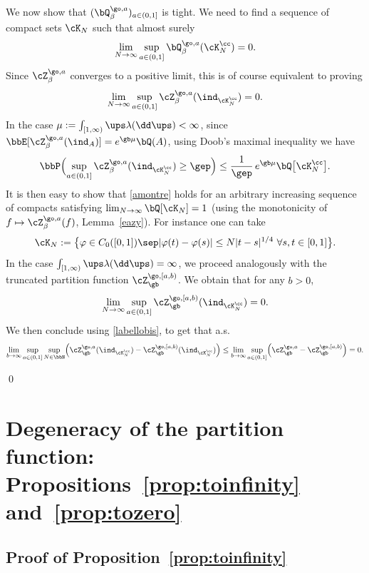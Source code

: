 We now show that $(\bQ^{\go,a}_{\beta})_{a\in (0,1]}$ is tight.
We need to find a sequence of
compact sets $\cK_N$ such that almost surely
\[
\lim_{N\to \infty} \sup_{a\in(0,1]} \bQ^{\go,a}_{\beta}(\cK^{\cc}_N)=0.
\]
Since $\cZ^{\go,a}_{\beta}$ converges to a positive limit, this is of course equivalent to proving
\begin{equation}\label{amontre}
\lim_{N\to \infty} \sup_{a\in(0,1]} \cZ^{\go,a}_{\beta} (\ind_{\cK^{\cc}_N}) =0.
\end{equation}
In the case $\mu:=\int_{[1,\infty)} \ups \lambda(\dd \ups) <\infty$, since $\bbE[\cZ^{\go,a}_{\beta}(\ind_A)]= e^{\gb\mu} \bQ(A)$, using Doob's maximal inequality we have
\begin{equation}
\bbP \Bigl(\sup_{a\in(0,1]} \cZ^{\go,a}_{\beta}(\ind_{\cK^{\cc}_N})\ge \gep \Bigr)
\le \frac{1}{\gep}\, e^{\gb \mu}\bQ\bigl[\cK^{\cc}_N\bigr].
\end{equation}
It is then easy to show that \eqref{amontre} holds for an arbitrary increasing sequence of compacts satisfying $\lim_{N\to \infty} \bQ[ \cK_N]=1$
(using the monotonicity of $f\mapsto \cZ^{\go,a}_{\beta}(f)$, \cf Lemma~\ref{eazy}).
For instance one can take
\[
\cK_N:= \bigl\{ \varphi\in C_0([0,1])\sep |\varphi(t)-\varphi(s)|\le N |t-s|^{1/4} \ \forall s,t\in [0,1] \bigr\}.
\]
In the case $\int_{[1,\infty)} \ups \lambda(\dd \ups) =\infty$,
we proceed analogously with the truncated partition function
$\cZ_{\gb}^{\go,[a,b)}$.
We obtain that for any $b>0$,
\[
\lim_{N\to\infty} \sup_{a\in (0,1]} \cZ_{\gb}^{\go,[a,b)} (\ind_{\cK_N^\cc}) =0.
\]
We then conclude using \eqref{labellobis}, to get that a.s.
\[
\lim_{b\to\infty} \sup_{a\in (0,1]} \sup_{N\in \bbN} \Bigl(\cZ_{\gb}^{\go,a} (\ind_{\cK_N^\cc}) - \cZ_{\gb}^{\go,[a,b)} (\ind_{\cK_N^\cc}) \Bigr)
\leq \lim_{b\to\infty} \sup_{a\in (0,1]} \Bigl(\cZ_{\gb}^{\go,a} - \cZ_{\gb}^{\go,[a,b)} \Bigr) =0.
\]
\par\vspace{-\baselineskip}
\qed

\section{Degeneracy of the partition function: Propositions~\ref{prop:toinfinity} and~\ref{prop:tozero}}
\label{sec:trivial}

\subsection{Proof of Proposition~\ref{prop:toinfinity}}
\label{sec:infinity}

